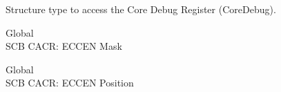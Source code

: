 \begin{DoxyRefList}
\label{deprecated__deprecated000557}%
%
Structure type to access the Core Debug Register (Core\+Debug).  
\item[Global \doxylink{group___c_m_s_i_s___s_c_b_ga7456a0b93710e8b9fa2b94c946e96c5c}{SCB\+\_\+\+CACR\+\_\+\+ECCEN\+\_\+\+Msk} ]\hfill \\
\label{deprecated__deprecated000556}%
%
SCB CACR\+: ECCEN Mask  
\item[Global \doxylink{group___c_m_s_i_s___s_c_b_ga76ce5adcbed2d2d8d425214a1e5d0579}{SCB\+\_\+\+CACR\+\_\+\+ECCEN\+\_\+\+Pos} ]\hfill \\
\label{deprecated__deprecated000555}%
%
SCB CACR\+: ECCEN Position 
\end{DoxyRefList}